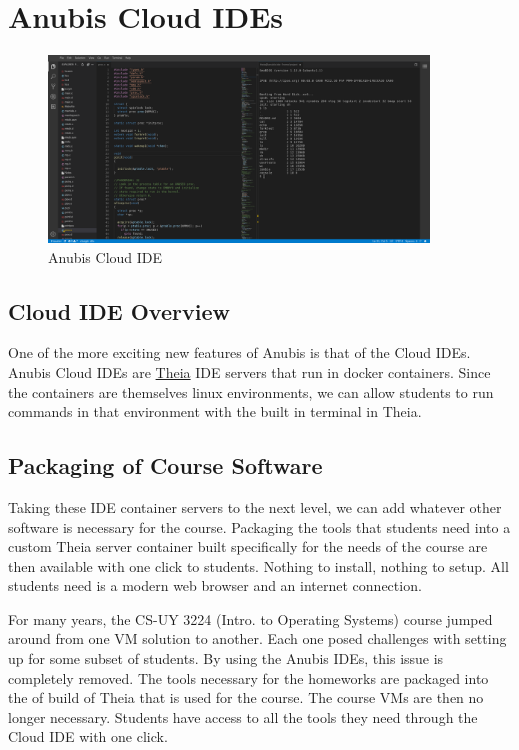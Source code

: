\chapter{Anubis Cloud IDEs}\label{ch:cloud_ides}

\begin{figure}[ht]
    \centering
    \includegraphics[width=0.9\textwidth]{figures/theia2}
    \caption{Anubis Cloud IDE\label{fig:theia2}}
\end{figure}

\section{Cloud IDE Overview}\label{sec:cloud-ide-overview}

One of the more exciting new features of Anubis is that of the Cloud IDEs.
Anubis Cloud IDEs are \href{https://theia-ide.org/}{Theia} IDE servers that run
in docker containers.
Since the containers are themselves linux environments, we can allow students
to run commands in that environment with the built in terminal in Theia.

\section{Packaging of Course Software}\label{sec:packaging-of-course-software}

Taking these IDE container servers to the next level, we can add whatever 
other software is necessary for the course.
Packaging the tools that students need into a custom Theia server container
built specifically for the needs of the course are then available with 
one click to students.
Nothing to install, nothing to setup.
All students need is a modern web browser and an internet connection.

For many years, the CS-UY 3224 (Intro. to Operating Systems) course
jumped around from one VM solution to another.
Each one posed challenges with setting up for some subset of students.
By using the Anubis IDEs, this issue is completely removed.
The tools necessary for the homeworks are packaged into the of build 
of Theia that is used for the course.
The course VMs are then no longer necessary.
Students have access to all the tools they need through the Cloud IDE
with one click.

